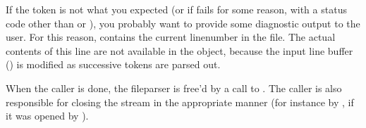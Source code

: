 If the token is not what you expected (or if
 fails for some reason, with a
status code other than  or ), you
probably want to provide some diagnostic output to the user. For this
reason,  contains the current linenumber in the
file.  The actual contents of this line are not available in the
 object, because the input line buffer ()
is modified as successive tokens are parsed out.

When the caller is done, the fileparser is free'd by a call to
. The caller is also responsible for
closing the stream in the appropriate manner (for instance by
, if it was opened by ).



